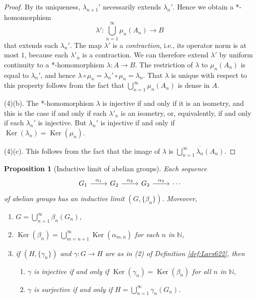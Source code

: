 \documentclass{book}
\newtheorem{proposition}[definition]{Proposition}
\begin{document}
\begin{proof}
  By its uniqueness, \(\lambda_{n+1}'\) necessarily extends \(\lambda_n'\). Hence we obtain 
  a *-homomorphism
  \[
    \lambda':\bigcup_{n=1}^\infty\mu_n(A_n)\to B
  \]
  that extends each \(\lambda_n'\). The map \(\lambda'\) is a \textit{contraction}, i.e., its operator norm is at most
  \(1\), because each \(\lambda'_n\) is a contraction. We can therefore extend \(\lambda'\) by
  uniform continuity to a *-homomorphism \(\lambda:A\to B\).
  The restriction of \(\lambda\) to \(\mu_n(A_n)\) is equal to \(\lambda_n'\), and hence \(\lambda\circ\mu_n=\lambda_n'\circ\mu_n=\lambda_n\).
  That \(\lambda\) is unique with respect to this property follows from the fact that
  \(\bigcup_{n=1}^\infty\mu_n(A_n)\) is dense in \(A\).\par
  (4)(b). The *-homomorphism \(\lambda\) is injective if and only if it is an isometry, and this is the case if and only if each \(\lambda'_n\)
  is an isometry, or, equivalently, if and only if each \(\lambda_n'\) is 
  injective. But \(\lambda_n'\) is injective if and only if \(\operatorname{Ker}(\lambda_n)=\operatorname{Ker}(\mu_n)\).\par
  (4)(c). This follows from the fact that the image of \(\lambda\) is \(\overline{\bigcup_{n=1}^\infty\lambda_n(A_n)}\).
\end{proof}
\begin{proposition}[Inductive limit of abelian groups]\label{prop:Lars625}
  Each sequence
  \[
    \begin{tikzcd}
      G_1\arrow[r,"\alpha_1"]&G_2\arrow[r,"\alpha_2"]&G_3\arrow[r,"\alpha_3"]&\cdots
    \end{tikzcd}
  \]
  of abelian groups has an inductive limit \((G,\{\beta_n\})\). Moreover,
  \begin{enumerate}
    \item \(G=\bigcup_{n=1}^\infty\beta_n(G_n)\),
    \item \(\operatorname{Ker}(\beta_n)=\bigcup_{m=n+1}^\infty\operatorname{Ker}(\alpha_{m,n})\) for each \(n\) in \(\mathbb{N}\),
    \item if \((H,\{\gamma_n\})\) and \(\gamma:G\to H\) are as in (2) of Definition \ref{def:Lars622}, then
      \begin{enumerate}
        \item \(\gamma\) is injective if and only if \(\operatorname{Ker}(\gamma_n)=\operatorname{Ker}(\beta_n)\) for all \(n\) in \(\mathbb{N}\),
        \item \(\gamma\) is surjective if and only if \(H=\bigcup_{n=1}^\infty\gamma_n(G_n)\).
      \end{enumerate}
  \end{enumerate}
\end{proposition}
\end{document}
